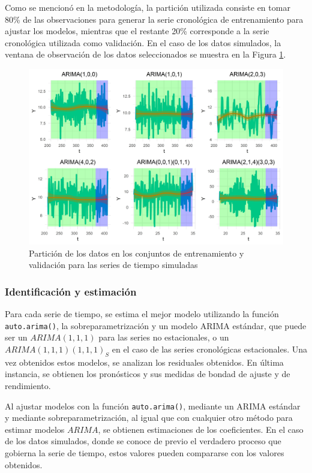 \documentclass[
]{article}
\begin{document}
Como se mencionó en la metodología, la partición utilizada consiste en
tomar 80\% de las observaciones para generar la serie cronológica de
entrenamiento para ajustar los modelos, mientras que el restante 20\%
corresponde a la serie cronológica utilizada como validación. En el caso
de los datos simulados, la ventana de observación de los datos
seleccionados se muestra en la Figura
\ref{fig:particion_series_simuladas}.

\begin{figure}[H]
\includegraphics[width=1\linewidth,height=1\textheight]{Tesis_files/figure-latex/particion_series_simuladas-1} \caption{Partición de los datos en los conjuntos de entrenamiento y validación para las series de tiempo simuladas}\label{fig:particion_series_simuladas}
\end{figure}

\subsubsection{Identificación y estimación}

Para cada serie de tiempo, se estima el mejor modelo utilizando la
función \texttt{auto.arima()}, la sobreparametrización y un modelo ARIMA
estándar, que puede ser un \(ARIMA(1,1,1)\) para las series no
estacionales, o un \(ARIMA(1,1,1)(1,1,1)_S\) en el caso de las series
cronológicas estacionales. Una vez obtenidos estos modelos, se analizan
los residuales obtenidos. En última instancia, se obtienen los
pronósticos y sus medidas de bondad de ajuste y de rendimiento.

Al ajustar modelos con la función \texttt{auto.arima()}, mediante un
ARIMA estándar y mediante sobreparametrización, al igual que con
cualquier otro método para estimar modelos \(ARIMA\), se obtienen
estimaciones de los coeficientes. En el caso de los datos simulados,
donde se conoce de previo el verdadero proceso que gobierna la serie de
tiempo, estos valores pueden compararse con los valores obtenidos.
\end{document}
